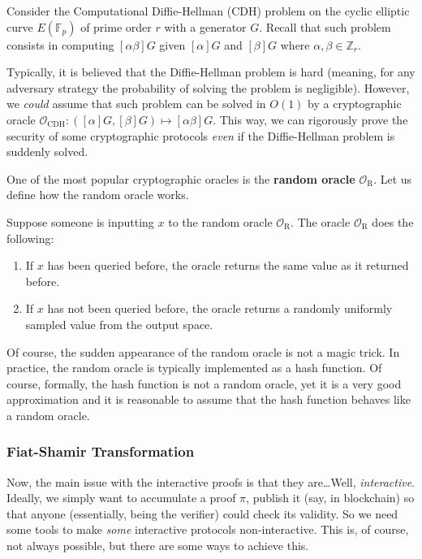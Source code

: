 \documentclass[../lecture-notes.tex]{subfiles}
\begin{document}
\begin{example}
    Consider the Computational Diffie-Hellman (CDH) problem on the cyclic elliptic curve $E(\mathbb{F}_p)$ of prime order $r$ with a generator $G$. Recall that such problem consists in computing $[\alpha\beta]G$ given $[\alpha]G$ and $[\beta]G$ where $\alpha,\beta \in \mathbb{Z}_r$. 

    Typically, it is believed that the Diffie-Hellman problem is hard (meaning, for any adversary strategy the probability of solving the problem is negligible). However, we \textit{could} assume that such problem can be solved in $O(1)$ by a cryptographic oracle $\mathcal{O}_{\text{CDH}}: ([\alpha]G,[\beta]G) \mapsto [\alpha\beta]G$. This way, we can rigorously prove the security of some cryptographic protocols \textit{even} if the Diffie-Hellman problem is suddenly solved. 
\end{example}

One of the most popular cryptographic oracles is the \textbf{random oracle} $\mathcal{O}_{\text{R}}$. Let us define how the random oracle works.

Suppose someone is inputting $x$ to the random oracle $\mathcal{O}_{\text{R}}$. The oracle $\mathcal{O}_{\text{R}}$ does the following:
\begin{enumerate}
    \item If $x$ has been queried before, the oracle returns the same value as it returned before.
    \item If $x$ has not been queried before, the oracle returns a randomly uniformly sampled value from the output space.
\end{enumerate}

\begin{remark}
    Of course, the sudden appearance of the random oracle is not a magic trick. In practice, the random oracle is typically implemented as a hash function. Of course, formally, the hash function is not a random oracle, yet it is a very good approximation and it is reasonable to assume that the hash function behaves like a random oracle.
\end{remark}

\subsubsection{Fiat-Shamir Transformation}

Now, the main issue with the interactive proofs is that they are\ldots Well, \textit{interactive}. Ideally, we simply want to accumulate a proof $\pi$, publish it (say, in blockchain) so that anyone (essentially, being the verifier) could check its validity. So we need some tools to make \textit{some} interactive protocols non-interactive. This is, of course, not always possible, but there are some ways to achieve this.
\end{document}
